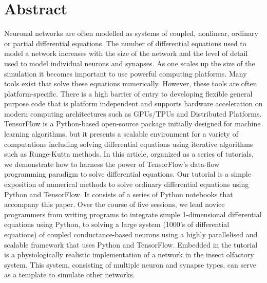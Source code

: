 \documentclass[10pt,letterpaper]{article}
\begin{document}
\section*{Abstract}
Neuronal networks are often modelled as systems of coupled, nonlinear, ordinary or
partial differential equations. The number of differential equations used to model a
network increases with the size of the network and the level of detail used to model
individual neurons and synapses. As one scales up the size of the simulation it becomes important to use powerful computing platforms. Many tools exist that solve these equations numerically. However, these tools are often platform-specific. There is a high barrier of entry to developing flexible general purpose code that is platform independent and supports hardware acceleration on modern computing architectures such as GPUs/TPUs and Distributed Platforms. TensorFlow is a Python-based open-source package initially designed for machine learning algorithms, but it presents a scalable environment for a variety of computations including solving differential equations using iterative algorithms such as Runge-Kutta methods. In this article, organized as a series of tutorials, we demonstrate how to harness the power of TensorFlow’s data-flow programming paradigm to solve differential equations. Our tutorial is a simple exposition of numerical methods to solve ordinary differential equations using Python and TensorFlow. It consists of a series of Python notebooks that accompany this paper. Over the course of five sessions, we lead novice programmers from writing programs to integrate simple 1-dimensional differential equations using Python, to solving a large system (1000’s of differential equations) of coupled conductance-based neurons using a highly parallelised and scalable framework that uses Python and TensorFlow. Embedded in the tutorial is a physiologically realistic implementation of a network in the insect olfactory system. This system, consisting of multiple neuron and synapse types, can serve as a template to simulate other networks.



\linenumbers

\end{document}
